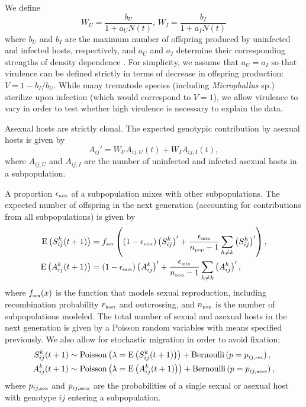 \documentclass{article}\usepackage[]{graphicx}\usepackage[]{color}
\begin{document}
We define
$$
W_U = \frac{b_U}{1 + a_U N(t)},\,  W_I = \frac{b_I}{1 + a_I N(t)}
$$
where $b_U$ and $b_I$ are the maximum number of offspring produced by uninfected and infected hosts, respectively, and $a_U$ and $a_I$ determine their corresponding strengths of density dependence \citep{smith1973stability, lively2010epidemiological}.
For simplicity, we assume that $a_U = a_I$ so that virulence can be defined strictly in terms of decrease in offspring production: $V = 1- b_I/b_U$.
While many trematode species (including \textit{Microphallus} sp.) sterilize upon 
infection (which would correspond to $V = 1$), we allow virulence to vary
in order to test whether high virulence is necessary to explain the data.

Asexual hosts are strictly clonal.
The expected genotypic contribution by asexual hosts is given by
\begin{equation}
A_{ij}' = W_U A_{ij,U} (t) + W_I A_{ij,I} (t),
\end{equation}
where $A_{ij, U}$ and $A_{ij,I}$ are the number of uninfected and infected asexual hosts in a subpopulation.

A proportion $\epsilon_{\textrm{\tiny mix}}$ of a subpopulation mixes with other subpopulations.
The expected number of offspring in the next generation (accounting for contributions from all subpopulations) is given by
\begin{equation}
\begin{aligned}
\mathrm{E}\left(S_{ij}^k(t+1)\right) &= f_{\textrm{\tiny sex}}\left((1 - \epsilon_{\textrm{\tiny mix}}) \left(S_{ij}^k\right)' + \frac{\epsilon_{\textrm{\tiny mix}}}{n_{\textrm{\tiny pop}}-1} \sum_{h \neq k} \left(S_{ij}^h\right)'\right),\\
\mathrm{E}\left(A_{ij}^k(t+1)\right) &= (1 - \epsilon_{\textrm{\tiny mix}}) \left(A_{ij}^k\right)' + \frac{\epsilon_{\textrm{\tiny mix}}}{n_{\textrm{\tiny pop}}-1} \sum_{h \neq k} \left(A_{ij}^h\right)',\\
\end{aligned}
\end{equation}
where $f_{\textrm{\tiny sex}}(x)$ is the function that models sexual reproduction, including recombination probability $r_{\textrm{\tiny host}}$ and outcrossing, and $n_{\textrm{\tiny pop}}$ is the number of subpopulations modeled.
The total number of sexual and asexual hosts in the next generation is given by a Poisson random variables with means specified previously. We also allow for stochastic migration in order to avoid fixation:
\begin{equation}
\begin{aligned}
S_{ij}^k(t+1) &\sim \mathrm{Poisson}\left(\lambda=\mathrm{E}\left(S_{ij}^k(t+1)\right)\right) + \mathrm{Bernoulli}\left(p=p_{ij,\textrm{\tiny sex}}\right),\\
A_{ij}^k(t+1) &\sim \mathrm{Poisson}\left(\lambda=\mathrm{E}\left(A_{ij}^k(t+1)\right)\right) + \mathrm{Bernoulli}\left(p=p_{ij, \textrm{\tiny asex}}\right),
\end{aligned}
\end{equation}
where $p_{ij,\textrm{\tiny sex}}$ and $p_{ij, \textrm{\tiny asex}}$ are the probabilities of a single sexual or asexual host with genotype $ij$ entering a subpopulation.
\end{document}
